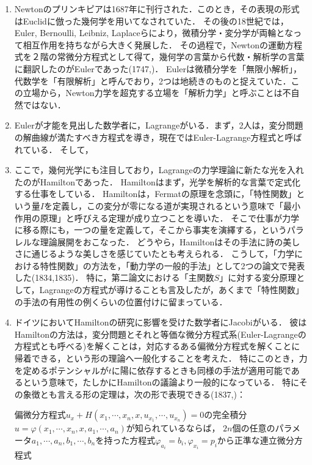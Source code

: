 \documentclass[uplatex, dvipdfmx]{jsarticle}
\begin{document}
\begin{enumerate}
    \item Newtonのプリンキピアは1687年に刊行された．このとき，その表現の形式はEuclidに倣った幾何学を用いてなされていた．
    その後の18世紀では，Euler, Bernoulli, Leibniz, Laplaceらにより，微積分学・変分学が両輪となって相互作用を持ちながら大きく発展した．
    その過程で，Newtonの運動方程式を２階の常微分方程式として得て，幾何学の言葉から代数・解析学の言葉に翻訳したのがEulerであった(1747,\cite{Euler1747})．
    Eulerは微積分学を「無限小解析」，代数学を「有限解析」と呼んでおり，2つは地続きのものと捉えていた．この立場から，Newton力学を超克する立場を「解析力学」と呼ぶことは不自然ではない．
    \item Eulerが才能を見出した数学者に，Lagrangeがいる．まず，2人は，変分問題の解曲線が満たすべき方程式を導き，現在ではEuler-Lagrange方程式と呼ばれている．
    そして，
    \item ここで，幾何光学にも注目しており，Lagrangeの力学理論に新たな光を入れたのがHamiltonであった．
    Hamiltonはまず，光学を解析的な言葉で定式化する仕事をしている．
    Hamiltonは，Fermatの原理を念頭に，「特性関数」という量$I$を定義し，この変分が零になる道が実現されるという意味で「最小作用の原理」と呼びえる定理が成り立つことを導いた．
    そこで仕事が力学に移る際にも，一つの量を定義して，そこから事実を演繹する，というパラレルな理論展開をおこなった．
    どうやら，Hamiltonはその手法に詩の美しさに通じるような美しさを感じていたとも考えられる．
    こうして，「力学における特性関数」の方法を，「動力学の一般的手法」として2つの論文で発表した(1834\cite{Hamilton34},1835\cite{Hamilton35})．
    特に，第二論文における「主関数$S$」に対する変分原理として，Lagrangeの方程式が導けることも言及したが，あくまで「特性関数」の手法の有用性の例くらいの位置付けに留まっている．
    \item ドイツにおいてHamiltonの研究に影響を受けた数学者にJacobiがいる．
    彼はHamiltonの方法は，変分問題とそれと等価な微分方程式系(Euler-Lagrangeの方程式とも呼べる)を解くことは，対応するある偏微分方程式を解くことに帰着できる，という形の理論へ一般化することを考えた．
    特にこのとき，力を定めるポテンシャルが$t$に陽に依存するときも同様の手法が適用可能であるという意味で，たしかにHamiltonの議論より一般的になっている．
    特にその象徴とも言える形の定理は，次の形で表現できる(1837,\cite{Jacobi37B})：
    \begin{theorem}
        偏微分方程式$u_x+H(x_1,\cdots,x_n,x,u_{x_1},\cdots,u_{x_n})=0$の完全積分$u=\varphi(x_1,\cdots,x_n,x,a_1,\cdots,a_n)$が知られているならば，
        $2n$個の任意のパラメータ$a_1,\cdots,a_n,b_1,\cdots,b_n$を持った方程式$\varphi_{a_i}=b_i,\varphi_{x_i}=p_i$から正準な連立微分方程式

\end{theorem}
\end{enumerate}
\end{document}
